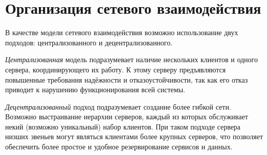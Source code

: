 \section{Организация сетевого взаимодействия} \label{technologic_network}

В качестве модели сетевого взаимодействия возможно использование двух подходов: централизованного и децентрализованного.

\vspace{\baselineskip}
\textit{Централизованная} модель подразумевает наличие нескольких клиентов и одного сервера, координирующего их работу. К этому серверу предъявляются повышенные требования надёжности и отказоустойчивости, так как его отказ приводит к нарушению функционирования всей системы.

\vspace{\baselineskip}
\textit{Децентрализованный} подход подразумевает создание более гибкой сети. Возможно выстраивание иерархии серверов, каждый из которых обслуживает некий (возможно уникальный) набор клиентов. При таком подходе сервера низших звеньев могут являться клиентами более крупных серверов, что позволяет обеспечить более простое и удобное резервирование сервисов и данных.